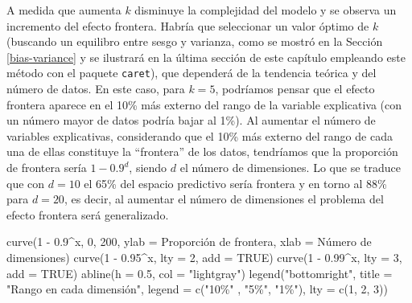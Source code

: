 \documentclass[
]{book}
\newenvironment{Shaded}{\begin{snugshade}}{\end{snugshade}}
\newcommand{\AttributeTok}[1]{\textcolor[rgb]{0.77,0.63,0.00}{#1}}
\newcommand{\ConstantTok}[1]{\textcolor[rgb]{0.00,0.00,0.00}{#1}}
\newcommand{\DecValTok}[1]{\textcolor[rgb]{0.00,0.00,0.81}{#1}}
\newcommand{\FloatTok}[1]{\textcolor[rgb]{0.00,0.00,0.81}{#1}}
\newcommand{\FunctionTok}[1]{\textcolor[rgb]{0.00,0.00,0.00}{#1}}
\newcommand{\NormalTok}[1]{#1}
\newcommand{\SpecialCharTok}[1]{\textcolor[rgb]{0.00,0.00,0.00}{#1}}
\newcommand{\StringTok}[1]{\textcolor[rgb]{0.31,0.60,0.02}{#1}}
\theoremstyle{break}
\theoremstyle{definition}
\theoremstyle{definition}
\theoremstyle{definition}
\theoremstyle{definition}
\theoremstyle{remark}
\begin{document}
A medida que aumenta \(k\) disminuye la complejidad del modelo y se observa un incremento del efecto frontera.
Habría que seleccionar un valor óptimo de \(k\) (buscando un equilibro entre sesgo y varianza, como se mostró en la Sección \ref{bias-variance} y se ilustrará en la última sección de este capítulo empleando este método con el paquete \texttt{caret}), que dependerá de la tendencia teórica y del número de datos.
En este caso, para \(k=5\), podríamos pensar que el efecto frontera aparece en el 10\% más externo del rango de la variable explicativa (con un número mayor de datos podría bajar al 1\%).
Al aumentar el número de variables explicativas, considerando que el 10\% más externo del rango de cada una de ellas constituye la ``frontera'' de los datos, tendríamos que la proporción de frontera sería \(1-0.9^d\), siendo \(d\) el número de dimensiones.
Lo que se traduce que con \(d = 10\) el 65\% del espacio predictivo sería frontera y en torno al 88\% para \(d=20\), es decir, al aumentar el número de dimensiones el problema del efecto frontera será generalizado.

\begin{Shaded}
\begin{Highlighting}[]
\FunctionTok{curve}\NormalTok{(}\DecValTok{1} \SpecialCharTok{{-}} \FloatTok{0.9}\SpecialCharTok{\^{}}\NormalTok{x, }\DecValTok{0}\NormalTok{, }\DecValTok{200}\NormalTok{, }\AttributeTok{ylab =} \StringTok{\textquotesingle{}Proporción de frontera\textquotesingle{}}\NormalTok{, }\AttributeTok{xlab =} \StringTok{\textquotesingle{}Número de dimensiones\textquotesingle{}}\NormalTok{)}
\FunctionTok{curve}\NormalTok{(}\DecValTok{1} \SpecialCharTok{{-}} \FloatTok{0.95}\SpecialCharTok{\^{}}\NormalTok{x, }\AttributeTok{lty =} \DecValTok{2}\NormalTok{, }\AttributeTok{add =} \ConstantTok{TRUE}\NormalTok{)}
\FunctionTok{curve}\NormalTok{(}\DecValTok{1} \SpecialCharTok{{-}} \FloatTok{0.99}\SpecialCharTok{\^{}}\NormalTok{x, }\AttributeTok{lty =} \DecValTok{3}\NormalTok{, }\AttributeTok{add =} \ConstantTok{TRUE}\NormalTok{)}
\FunctionTok{abline}\NormalTok{(}\AttributeTok{h =} \FloatTok{0.5}\NormalTok{, }\AttributeTok{col =} \StringTok{"lightgray"}\NormalTok{)}
\FunctionTok{legend}\NormalTok{(}\StringTok{"bottomright"}\NormalTok{, }\AttributeTok{title =} \StringTok{"Rango en cada dimensión"}\NormalTok{, }\AttributeTok{legend =} \FunctionTok{c}\NormalTok{(}\StringTok{"10\%"}\NormalTok{ , }\StringTok{"5\%"}\NormalTok{, }\StringTok{"1\%"}\NormalTok{), }
       \AttributeTok{lty =} \FunctionTok{c}\NormalTok{(}\DecValTok{1}\NormalTok{, }\DecValTok{2}\NormalTok{, }\DecValTok{3}\NormalTok{))}
\end{Highlighting}
\end{Shaded}
\end{document}

